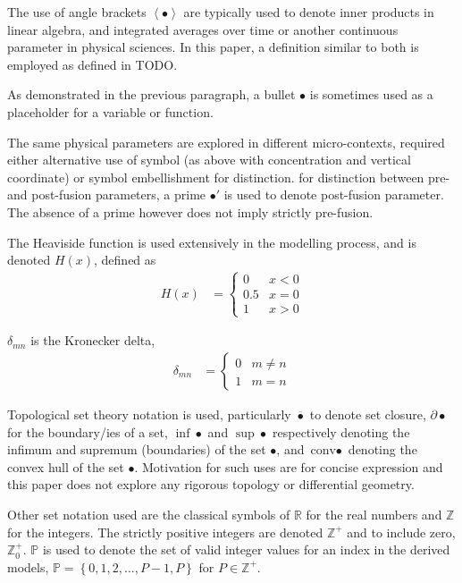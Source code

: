 \documentclass{report}
\newcommand\Brace[1]{{ \left\{{#1}\right\} }}
\newcommand\Angle[1]{{ \left\langle{#1}\right\rangle }}
\newcommand\bbP{{ \mathbb{P} }}
\newcommand\bbR{{ \mathbb{R} }}
\newcommand\bbZ{{ \mathbb{Z} }}
\newcommand\conv{{ \text{conv} }}
\begin{document}
The use of angle brackets $\Angle{\bullet}$ are typically used to denote inner products in linear algebra, and integrated averages over time or another continuous parameter in physical sciences. In this paper, a definition similar to both is employed as defined in TODO.

As demonstrated in the previous paragraph, a bullet $\bullet$ is sometimes used as a placeholder for a variable or function.

The same physical parameters are explored in different micro-contexts, required either alternative use of symbol (as above with concentration and vertical coordinate) or symbol embellishment for distinction. for distinction between pre- and post-fusion parameters, a prime $\bullet'$ is used to denote post-fusion parameter. The absence of a prime however does not imply strictly pre-fusion.

The Heaviside function is used extensively in the modelling process, and is denoted $H(x)$, defined as
\begin{align*}
	H(x) &= \begin{cases}
		0 & x < 0 \\
		0.5 & x = 0 \\
		1 & x > 0
	\end{cases}
\end{align*}

$\delta_{mn}$ is the Kronecker delta,
\begin{align*}
	\delta_{mn} &= \begin{cases}
		0 & m \neq n \\
		1 & m = n
	\end{cases}
\end{align*}

Topological set theory notation is used, particularly $\overline\bullet$ to denote set closure, $\partial\bullet$ for the boundary/ies of a set, $\inf\bullet$ and $\sup\bullet$ respectively denoting the infimum and supremum (boundaries) of the set $\bullet$, and $\conv\bullet$ denoting the convex hull of the set $\bullet$. Motivation for such uses are for concise expression and this paper does not explore any rigorous topology or differential geometry.

Other set notation used are the classical symbols of $\bbR$ for the real numbers and $\bbZ$ for the integers. The strictly positive integers are denoted $\bbZ^+$ and to include zero, $\bbZ_0^+$. $\bbP$ is used to denote the set of valid integer values for an index in the derived models, $\bbP = \Brace{0, 1, 2, ..., P-1, P}$ for $P \in \bbZ^+$.
\end{document}
